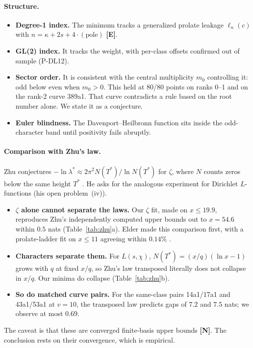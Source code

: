 \documentclass[11pt]{article}
\theoremstyle{remark}
\newcommand{\tagE}{\textbf{[E]}}
\newcommand{\tagN}{\textbf{[N]}}
\begin{document}
\paragraph{Structure.}
\begin{itemize}
\item \textbf{Degree-1 index.} The minimum tracks a generalized prolate leakage $\ell_n(c)$ with $n=\kappa+2s+4\cdot(\text{pole})$ \tagE.
\item \textbf{GL(2) index.} It tracks the weight, with per-class offsets confirmed out of sample (P-DL12).
\item \textbf{Sector order.} It is consistent with the central multiplicity $m_0$ controlling it: odd below even when $m_0>0$. This held at 80/80 points on ranks 0--1 and on the rank-2 curve 389a1. That curve contradicts a rule based on the root number alone. We state it as a conjecture.
\item \textbf{Euler blindness.} The Davenport--Heilbronn function sits inside the odd-character band until positivity fails abruptly.
\end{itemize}

\paragraph{Comparison with Zhu's law.} Zhu conjectures $-\ln\lambda^*\approx2\pi^2N(T^*)/\ln N(T^*)$ for $\zeta$, where $N$ counts zeros below the same height $T^*$ \cite{zhu26}. He asks for the analogous experiment for Dirichlet $L$-functions (his open problem~(iv)).
\begin{itemize}
\item \textbf{$\zeta$ alone cannot separate the laws.} Our $\zeta$ fit, made on $x\le19.9$, reproduces Zhu's independently computed upper bounds out to $x=54.6$ within $0.5$ nats (Table~\ref{tab:zhu}a). Elder made this comparison first, with a prolate-ladder fit on $x\le11$ agreeing within $0.14\%$ \cite{elder26}.
\item \textbf{Characters separate them.} For $L(s,\chi)$, $N(T^*)=(x/q)(\ln x-1)$ grows with $q$ at fixed $x/q$, so Zhu's law transposed literally does not collapse in $x/q$. Our minima do collapse (Table~\ref{tab:zhu}b).
\item \textbf{So do matched curve pairs.} For the same-class pairs 14a1/17a1 and 43a1/53a1 at $v=10$, the transposed law predicts gaps of $7.2$ and $7.5$ nats; we observe at most $0.69$.
\end{itemize}
The caveat is that these are converged finite-basis upper bounds \tagN. The conclusion rests on their convergence, which is empirical.
\end{document}
